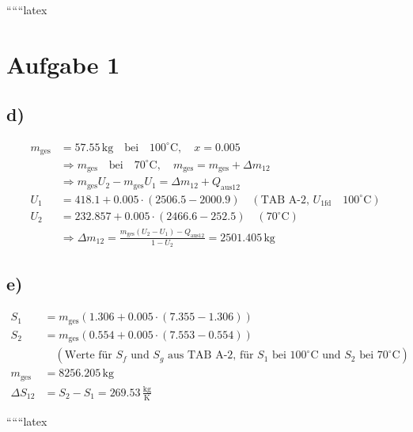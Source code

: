 ``````latex


\section*{Aufgabe 1}

\subsection*{d)}
\begin{align*}
m_{\text{ges}} &= 57.55 \, \text{kg} \quad \text{bei} \quad 100^\circ \text{C}, \quad x = 0.005 \\
&\Rightarrow m_{\text{ges}} \quad \text{bei} \quad 70^\circ \text{C}, \quad m_{\text{ges}} = m_{\text{ges}} + \Delta m_{12} \\
&\Rightarrow m_{\text{ges}} U_2 - m_{\text{ges}} U_1 = \Delta m_{12} + Q_{\text{aus}12} \\
U_1 &= 418.1 + 0.005 \cdot (2506.5 - 2000.9) \quad \left( \text{TAB A-2, } U_{1\text{fd}} \quad 100^\circ \text{C} \right) \\
U_2 &= 232.857 + 0.005 \cdot (2466.6 - 252.5) \quad \left( 70^\circ \text{C} \right) \\
&\Rightarrow \Delta m_{12} = \frac{m_{\text{ges}} (U_2 - U_1) - Q_{\text{aus}12}}{1 - U_2} = 2501.405 \, \text{kg}
\end{align*}

\subsection*{e)}
\begin{align*}
S_1 &= m_{\text{ges}} \left( 1.306 + 0.005 \cdot (7.355 - 1.306) \right) \\
S_2 &= m_{\text{ges}} \left( 0.554 + 0.005 \cdot (7.553 - 0.554) \right) \\
&\quad \left( \text{Werte für } S_f \text{ und } S_g \text{ aus TAB A-2, für } S_1 \text{ bei } 100^\circ \text{C} \text{ und } S_2 \text{ bei } 70^\circ \text{C} \right) \\
m_{\text{ges}} &= 8256.205 \, \text{kg} \\
\Delta S_{12} &= S_2 - S_1 = 269.53 \, \frac{\text{kg}}{\text{K}}
\end{align*}

``````latex


